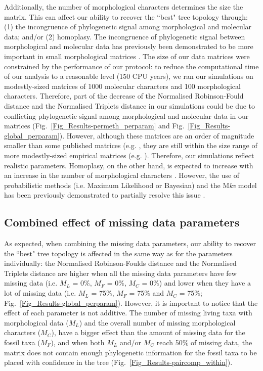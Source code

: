 \documentclass[10pt,letterpaper]{article}
\begin{document}
Additionally, the number of morphological characters determines the size the matrix. This can affect our ability to recover the ``best" tree topology through: (1) the incongruence of phylogenetic signal among morphological and molecular data; and/or (2) homoplasy. The incongruence of phylogenetic signal between morphological and molecular data has previously been demonstrated to be more important in small morphological matrices \cite{wagner2000}. The size of our data matrices were constrained by the performance of our protocol: to reduce the computational time of our analysis to a reasonable level (150 CPU years), we ran our simulations on modestly-sized matrices of 1000 molecular characters and 100 morphological characters. Therefore, part of the decrease of the Normalised Robinson-Fould distance and the Normalised Triplets distance in our simulations could be due to conflicting phylogenetic signal among morphological and molecular data in our matrices (Fig.~\ref{Fig_Results-permeth_perparam} and Fig.~\ref{Fig_Results-global_perparam}). However, although these matrices are an order of magnitude smaller than some published matrices (e.g. \cite{springermacroevolutionary2012,nithe2013}, they are still within the size range of more modestly-sized empirical matrices (e.g. \cite{kellymolecular2014, sallam2011craniodental}). Therefore, our simulations reflect realistic parameters. Homoplasy, on the other hand, is expected to increase with an increase in the number of morphological characters \cite{wrightbayesian2014}. However, the use of probabilistic methods (i.e. Maximum Likelihood or Bayesian) and the M\textit{kv} model \cite{lewisa2001} has been previously demonstrated to partially resolve this issue \cite{wrightbayesian2014}.

\subsection*{Combined effect of missing data parameters}
As expected, when combining the missing data parameters, our ability to recover the ``best" tree topology is affected in the same way as for the parameters individually: the Normalised Robinson-Foulds distance and the Normalised Triplets distance are higher when all the missing data parameters have few missing data (i.e. $M_{L}$ = 0\%, $M_{F}$ = 0\%, $M_{C}$ = 0\%) and lower when they have a lot of missing data (i.e. $M_{L}$ = 75\%, $M_{F}$ = 75\% and $M_{C}$ = 75\%; Fig.~\ref{Fig_Results-global_perparam}). However, it is important to notice that the effect of each parameter is not additive. The number of missing living taxa with morphological data ($M_{L}$) and the overall number of missing morphological characters ($M_{C}$), have a bigger effect than the amount of missing data for the fossil taxa ($M_{F}$), and when both $M_{L}$ and/or $M_{C}$ reach 50\% of missing data, the matrix does not contain enough phylogenetic information for the fossil taxa to be placed with confidence in the tree (Fig.~\ref{Fig_Results-paircomp_within}).
\end{document}
